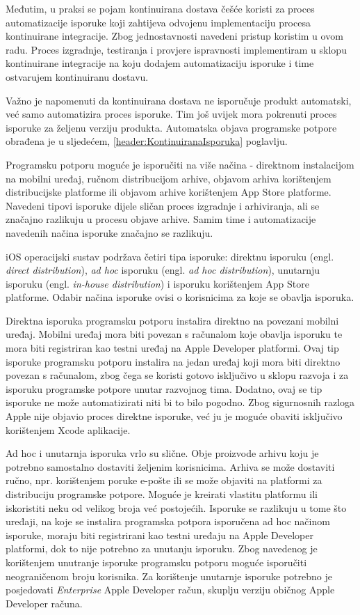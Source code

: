 \documentclass[times, utf8, diplomski, numeric]{fer}
\newcommand{\eng}[1]{(engl. \textit{#1})}
\begin{document}
Međutim, u praksi se pojam kontinuirana dostava češće koristi za proces automatizacije isporuke koji zahtijeva odvojenu implementaciju procesa kontinuirane integracije. Zbog jednostavnosti navedeni pristup koristim u ovom radu. Proces izgradnje, testiranja i provjere ispravnosti implementiram u sklopu kontinuirane integracije na koju dodajem automatizaciju isporuke i time ostvarujem kontinuiranu dostavu.

Važno je napomenuti da kontinuirana dostava ne isporučuje produkt automatski, već samo automatizira proces isporuke. Tim još uvijek mora pokrenuti proces isporuke za željenu verziju produkta. Automatska objava programske potpore obrađena je u sljedećem, \ref{header:KontinuiranaIsporuka} poglavlju.

Programsku potporu moguće je isporučiti na više načina - direktnom instalacijom na mobilni uređaj, ručnom distribucijom arhive, objavom arhiva korištenjem distribucijske platforme ili objavom arhive korištenjem App Store platforme. Navedeni tipovi isporuke dijele sličan proces izgradnje i arhiviranja, ali se značajno razlikuju u procesu objave arhive. Samim time i automatizacije navedenih načina isporuke značajno se razlikuju.

iOS operacijski sustav podržava četiri tipa isporuke: direktnu isporuku \eng{direct distribution}, \textit{ad hoc} isporuku \eng{ad hoc distribution}, unutarnju isporuku \eng{in-house distribution} i isporuku korištenjem App Store platforme. Odabir načina isporuke ovisi o korisnicima za koje se obavlja isporuka.

Direktna isporuka programsku potporu instalira direktno na povezani mobilni uređaj. Mobilni uređaj mora biti povezan s računalom koje obavlja isporuku te mora biti registriran kao testni uređaj na Apple Developer platformi. Ovaj tip isporuke programsku potporu instalira na jedan uređaj koji mora biti direktno povezan s računalom, zbog čega se koristi gotovo isključivo u sklopu razvoja i za isporuku programske potpore unutar razvojnog tima. Dodatno, ovaj se tip isporuke ne može automatizirati niti bi to bilo pogodno. Zbog sigurnosnih razloga Apple nije objavio proces direktne isporuke, već ju je moguće obaviti isključivo korištenjem Xcode aplikacije.

Ad hoc i unutarnja isporuka vrlo su slične. Obje proizvode arhivu koju je potrebno samostalno dostaviti željenim korisnicima. Arhiva se može dostaviti ručno, npr. korištenjem poruke e-pošte ili se može objaviti na platformi za distribuciju programske potpore. Moguće je kreirati vlastitu platformu ili iskoristiti neku od velikog broja već postojećih. Isporuke se razlikuju u tome što uređaji, na koje se instalira programska potpora isporučena ad hoc načinom isporuke, moraju biti registrirani kao testni uređaju na Apple Developer platformi, dok to nije potrebno za unutanju isporuku. Zbog navedenog je korištenjem unutranje isporuke programsku potporu moguće isporučiti neograničenom broju korisnika. Za korištenje unutarnje isporuke potrebno je posjedovati \textit{Enterprise} Apple Developer račun, skuplju verziju običnog Apple Developer računa.
\end{document}
